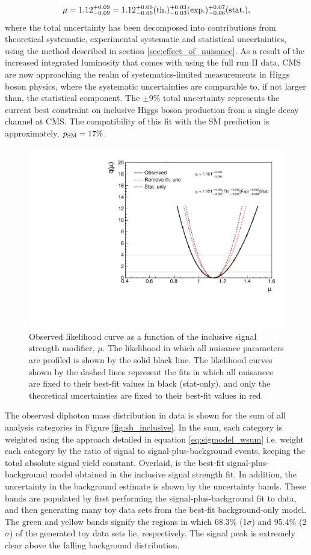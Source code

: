 \begin{equation*}
  \mu = 1.12 ^{+0.09}_{-0.09} = 1.12 ^{+0.06}_{-0.06}({\rm{th.}}) ^{+0.03}_{-0.03}({\rm{exp.}}) ^{+0.07}_{-0.06}({\rm{stat.}}),
\end{equation*}
\noindent
where the total uncertainty has been decomposed into contributions from theoretical systematic, experimental systematic and statistical uncertainties, using the method described in section \ref{sec:effect_of_nuisance}. As a result of the increased integrated luminosity that comes with using the full run II data, CMS are now approaching the realm of systematics-limited measurements in Higgs boson physics, where the systematic uncertainties are comparable to, if not larger than, the statistical component. The $\pm$9\% total uncertainty represents the current best constraint on inclusive Higgs boson production from a single decay channel at CMS. The compatibility of this fit with the SM prediction is approximately, $p_{\rm{SM}}=17\%$.

\begin{figure}[htb!]
  \centering
  \includegraphics[width=.6\textwidth]{Figures/hgg_results/likelihood_mu.pdf}
  \caption[Observed likelihood curve for the inclusive signal strength]
  {
    Observed likelihood curve as a function of the inclusive signal strength modifier, $\mu$. The likelihood in which all nuisance parameters are profiled is shown by the solid black line. The likelihood curves shown by the dashed lines represent the fits in which all nuisances are fixed to their best-fit values in black (stat-only), and only the theoretical uncertainties are fixed to their best-fit values in red.
  }
  \label{fig:likelihood_mu_inclusive}
\end{figure}

The observed diphoton mass distribution in data is shown for the sum of all analysis categories in Figure \ref{fig:sb_inclusive}. In the sum, each category is weighted using the approach detailed in equation \ref{eq:sigmodel_wsum} i.e. weight each category by the ratio of signal to signal-plus-background events, keeping the total absolute signal yield constant. Overlaid, is the best-fit signal-plus-background model obtained in the inclusive signal strength fit. In addition, the uncertainty in the background estimate is shown by the uncertainty bands. These bands are populated by first performing the signal-plus-background fit to data, and then generating many toy data sets from the best-fit background-only model. The green and yellow bands signify the regions in which 68.3\% (1$\sigma$) and 95.4\% (2$\sigma$) of the generated toy data sets lie, respectively. The signal peak is extremely clear above the falling background distribution.

